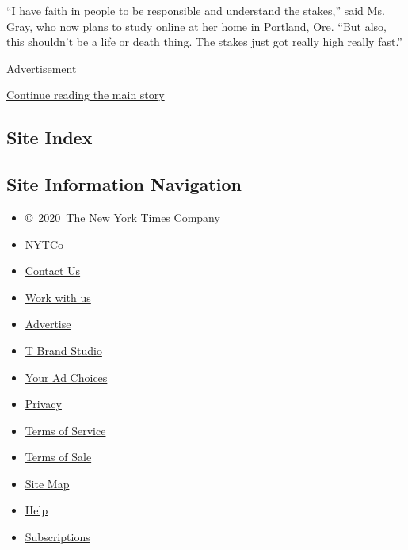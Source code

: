 ``I have faith in people to be responsible and understand the stakes,''
said Ms. Gray, who now plans to study online at her home in Portland,
Ore. ``But also, this shouldn't be a life or death thing. The stakes
just got really high really fast.''

Advertisement

\protect\hyperlink{after-bottom}{Continue reading the main story}

\hypertarget{site-index}{%
\subsection{Site Index}\label{site-index}}

\hypertarget{site-information-navigation}{%
\subsection{Site Information
Navigation}\label{site-information-navigation}}

\begin{itemize}
\tightlist
\item
  \href{https://help.nytimes3xbfgragh.onion/hc/en-us/articles/115014792127-Copyright-notice}{©~2020~The
  New York Times Company}
\end{itemize}

\begin{itemize}
\tightlist
\item
  \href{https://www.nytco.com/}{NYTCo}
\item
  \href{https://help.nytimes3xbfgragh.onion/hc/en-us/articles/115015385887-Contact-Us}{Contact
  Us}
\item
  \href{https://www.nytco.com/careers/}{Work with us}
\item
  \href{https://nytmediakit.com/}{Advertise}
\item
  \href{http://www.tbrandstudio.com/}{T Brand Studio}
\item
  \href{https://www.nytimes3xbfgragh.onion/privacy/cookie-policy\#how-do-i-manage-trackers}{Your
  Ad Choices}
\item
  \href{https://www.nytimes3xbfgragh.onion/privacy}{Privacy}
\item
  \href{https://help.nytimes3xbfgragh.onion/hc/en-us/articles/115014893428-Terms-of-service}{Terms
  of Service}
\item
  \href{https://help.nytimes3xbfgragh.onion/hc/en-us/articles/115014893968-Terms-of-sale}{Terms
  of Sale}
\item
  \href{https://spiderbites.nytimes3xbfgragh.onion}{Site Map}
\item
  \href{https://help.nytimes3xbfgragh.onion/hc/en-us}{Help}
\item
  \href{https://www.nytimes3xbfgragh.onion/subscription?campaignId=37WXW}{Subscriptions}
\end{itemize}
